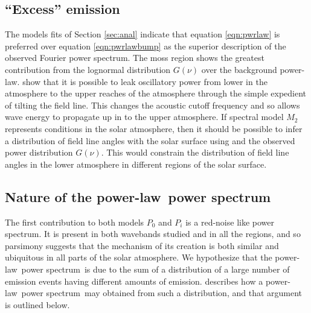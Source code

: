 \documentclass{aastex}
\newcommand{\PS}{power spectrum}
\newcommand{\PL}{power-law}
\begin{document}
{\subsection{``Excess'' emission}\label{ssec:excess}
The models fits of Section \ref{sec:anal} indicate that equation
\ref{eqn:pwrlaw} is preferred over equation \ref{eqn:pwrlawbump} as
the superior description of the observed Fourier \PS. The
moss region shows the greatest contribution from the lognormal
distribution $G(\nu)$ over the background \PL.
\cite{2005ApJ...624L..61D} show that it is possible to leak
oscillatory power from lower in the atmosphere to the upper reaches of
the atmosphere through the simple expedient of tilting the field line.
This changes the acoustic cutoff frequency and so allows wave energy
to propagate up in to the upper atmosphere.  If spectral model $M_{2}$
represents conditions in the solar atmosphere, then it should be
possible to infer a distribution of field line angles with the solar
surface using \cite{2005ApJ...624L..61D} and the observed power
distribution $G(\nu)$.  This would constrain the distribution of field
line angles in the lower atmosphere in different regions of the solar
surface.


\subsection{Nature of the \protect\PL\ \protect\PS}\label{ssec:nplps}
The first contribution to both models $P_{0}$ and $P_{i}$ is a
red-noise like \PS.  It is present in both wavebands
studied and in all the regions, and so parsimony suggests that the
mechanism of its creation is both similar and ubiquitous in all parts
of the solar atmosphere.  We hypothesize that the \PL\ \PS\ is due to
the sum of a distribution of a large number of emission events having
different amounts of emission. \cite{2011soca.book.....A} describes how a
\PL\ \PS\ may obtained from such a distribution, and that argument is
outlined below.

}
\end{document}
